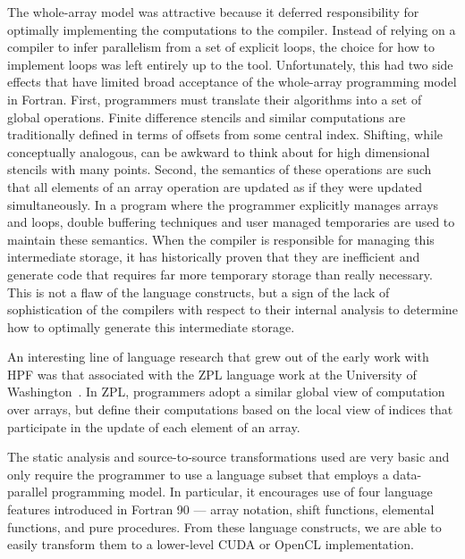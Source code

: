 The whole-array model was attractive because it deferred
responsibility for optimally implementing the computations to the
compiler.  Instead of relying on a compiler to infer parallelism from
a set of explicit loops, the choice for how to implement loops was
left entirely up to the tool.  Unfortunately, this had two side
effects that have limited broad acceptance of the whole-array
programming model in Fortran.  First, programmers must translate their
algorithms into a set of global operations.  Finite difference
stencils and similar computations are traditionally defined in terms
of offsets from some central index.  Shifting, while conceptually
analogous, can be awkward to think about for high dimensional stencils
with many points.  Second, the semantics of these operations are such
that all elements of an array operation are updated as if they were
updated simultaneously.  In a program where the programmer explicitly
manages arrays and loops, double buffering techniques and user managed
temporaries are used to maintain these semantics.  When the compiler
is responsible for managing this intermediate storage, it has
historically proven that they are inefficient and generate code that
requires far more temporary storage than really necessary.  This is
not a flaw of the language constructs, but a sign of the lack of
sophistication of the compilers with respect to their internal
analysis to determine how to optimally generate this intermediate
storage.

An interesting line of language research that grew out of the early work
with HPF was that associated with the ZPL language work at the University
of Washington~\cite{chamberlain04zpl}.  In ZPL, programmers adopt a similar
global view of computation over arrays, but define their computations based
on the local view of indices that participate in the update of each element of
an array.



The static analysis and source-to-source transformations used are very
basic and only require the programmer to use a language subset that
employs a data-parallel programming model.  In particular, it
encourages use of four language features introduced in Fortran 90 ---
array notation, shift functions, elemental functions, and pure
procedures.  From these language constructs, we are able to easily
transform them to a lower-level CUDA or OpenCL implementation.


